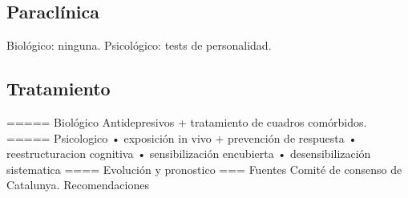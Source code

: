 \subsection*{Paraclínica}
Biológico: ninguna. Psicológico: tests de personalidad.
\subsection*{Tratamiento}
===== Biológico
Antidepresivos + tratamiento de cuadros comórbidos.
===== Psicologico
• exposición in vivo + prevención de respuesta
• reestructuracion cognitiva
• sensibilización encubierta
• desensibilización sistematica
==== Evolución y pronostico
=== Fuentes
Comité de consenso de Catalunya. Recomendaciones

